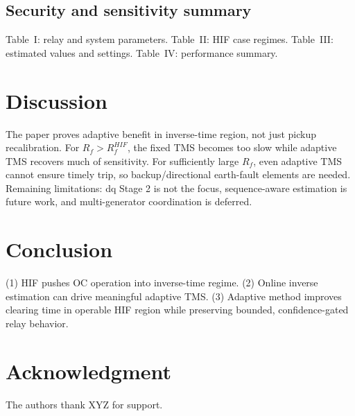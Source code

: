 \documentclass[10pt,journal,compsoc]{IEEEtran}
\begin{document}
\subsection{Security and sensitivity summary}
Table~I: relay and system parameters.
Table~II: HIF case regimes.
Table~III: estimated values and settings.
Table~IV: performance summary.

\section{Discussion}
The paper proves adaptive benefit in inverse-time region, not just pickup recalibration. For $R_f>R_f^{HIF}$, the fixed TMS becomes too slow while adaptive TMS recovers much of sensitivity.
For sufficiently large $R_f$, even adaptive TMS cannot ensure timely trip, so backup/directional earth-fault elements are needed. Remaining limitations: dq Stage 2 is not the focus, sequence-aware estimation is future work, and multi-generator coordination is deferred.

\section{Conclusion}
(1) HIF pushes OC operation into inverse-time regime. (2) Online inverse estimation can drive meaningful adaptive TMS. (3) Adaptive method improves clearing time in operable HIF region while preserving bounded, confidence-gated relay behavior.

\section*{Acknowledgment}
The authors thank XYZ for support.

\nocite{*}


\end{document}
